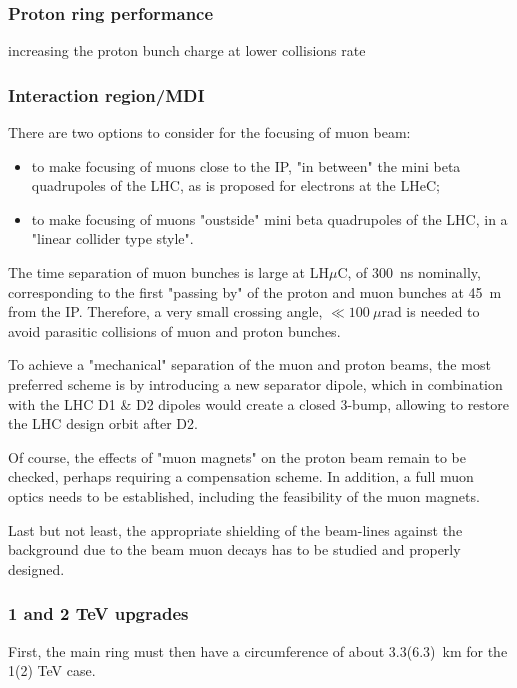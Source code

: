 \documentclass[a4paper,11pt]{article}
\newcommand{\lhuc}{LH\ensuremath{\mu}C\xspace}
\begin{document}
\subsubsection{Proton ring performance}

increasing the proton bunch charge at lower collisions rate

\subsubsection{Interaction region/MDI}

There are two options to consider for the focusing of muon beam:
\begin{itemize}
    \item to make focusing of muons close to the IP, "in between" the mini beta quadrupoles of the LHC, as is proposed for electrons at the LHeC;
    \item to make focusing of muons "oustside" mini beta quadrupoles of the LHC,
in a "linear collider type style".
\end{itemize}

The time separation of muon bunches is large at \lhuc, of 300~ns nominally, corresponding to the first "passing by" of the proton and muon bunches at 45~m from the IP. Therefore, a very small crossing angle, $\ll 100~\mu$rad is needed to avoid parasitic collisions of muon and proton bunches. 

To achieve a "mechanical" separation of the muon and proton beams, the most preferred scheme is by introducing a new
separator dipole, which in combination with the LHC D1 \& D2 dipoles would create a closed 3-bump, allowing to restore the LHC design orbit after D2.

Of course, the effects of "muon magnets" 
on the proton beam remain to be checked,
perhaps requiring a compensation scheme.
In addition, a full muon optics needs to be established, including the feasibility of the muon magnets.

Last but not least, the appropriate shielding of the beam-lines against the background due to the beam muon decays has to be studied and properly designed. 

\subsubsection{1 and 2 TeV upgrades}

First, the main ring must then have a circumference of about 3.3(6.3)~km for the 1(2) TeV case.
\end{document}
